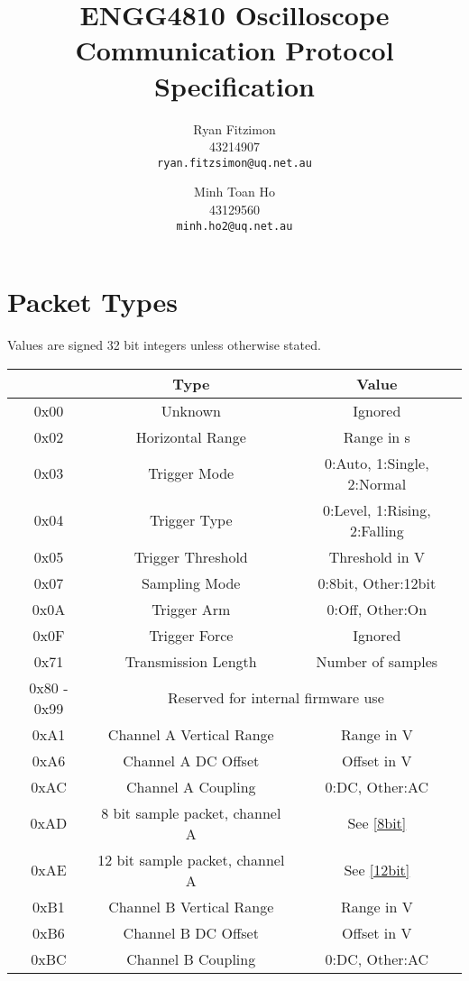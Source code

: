 \documentclass[]{article}
\title{ENGG4810 Oscilloscope Communication Protocol Specification}
\author{
	Ryan Fitzimon\\
	43214907\\
	\texttt{ryan.fitzsimon@uq.net.au}
	\and
	Minh Toan Ho\\
	43129560\\
	\texttt{minh.ho2@uq.net.au}
}
\begin{document}
\maketitle

\section{Packet Types}

Values are signed 32 bit integers unless otherwise stated.

\begin{table}[H]
	 
	 
	\renewcommand{\arraystretch}{1.2}
	\centering
	\begin{tabular}{|>{\ttfamily}c|c|c|}
		\hline
		\normalfont{\textbf{Identifier}} & \textbf{Type} & \textbf{Value} \\ \hline
		0x00 & Unknown & Ignored \\ \hline
		0x02 & Horizontal Range & Range in \textmu s \\ \hline
		0x03 & Trigger Mode & 0:Auto, 1:Single, 2:Normal \\ \hline
		0x04 & Trigger Type & 0:Level, 1:Rising, 2:Falling \\ \hline
		0x05 & Trigger Threshold & Threshold in \textmu V \\ \hline
		0x07 & Sampling Mode & 0:8bit, Other:12bit \\ \hline
		0x0A & Trigger Arm & 0:Off, Other:On \\ \hline 
		0x0F & Trigger Force & Ignored \\ \hline 
		0x71 & Transmission Length & Number of samples \\ \hline
		0x80 - 0x99 & \multicolumn{2}{c|}{Reserved for internal firmware use} \\ \hline
		0xA1 & Channel A Vertical Range & Range in \textmu V \\ \hline
		0xA6 & Channel A DC Offset & Offset in \textmu V \\ \hline
		0xAC & Channel A Coupling & 0:DC, Other:AC \\ \hline
		0xAD & 8 bit sample packet, channel A & See \autoref{8bit} \\ \hline
		0xAE & 12 bit sample packet, channel A & See \autoref{12bit} \\ \hline
		0xB1 & Channel B Vertical Range & Range in \textmu V \\ \hline
		0xB6 & Channel B DC Offset & Offset in \textmu V \\ \hline
		0xBC & Channel B Coupling & 0:DC, Other:AC \\ \hline

\end{tabular}
\end{table}
\end{document}
